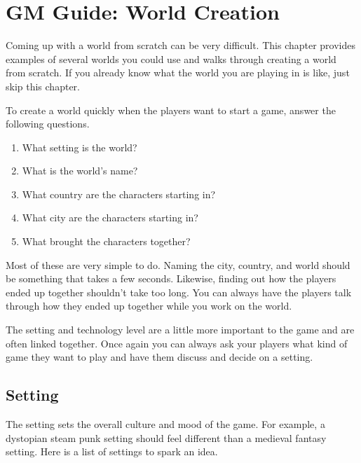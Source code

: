 \chapter{GM Guide: World Creation} \label{world_creation}

Coming up with a world from scratch can be very difficult. This chapter provides
examples of several worlds you could use and walks through creating a world
from scratch. If you already know what the world you are playing in is like,
just skip this chapter.

To create a world quickly when the players want to start a game, answer the
following questions.

\begin{enumerate}

    \item{What setting is the world?}
    \item{What is the world's name?}
    \item{What country are the characters starting in?}
    \item{What city are the characters starting in?}
    \item{What brought the characters together?}

\end{enumerate}

Most of these are very simple to do. Naming the city, country, and world should
be something that takes a few seconds. Likewise, finding out how the players
ended up together shouldn't take too long. You can always have the players
talk through how they ended up together while you work on the world.

The setting and technology level are a little more important to the game and
are often linked together. Once again you can always ask your players what kind
of game they want to play and have them discuss and decide on a setting.

\section*{Setting}

The setting sets the overall culture and mood of the game. For example,
a dystopian steam punk setting should feel different than a medieval fantasy
setting. Here is a list of settings to spark an idea.

